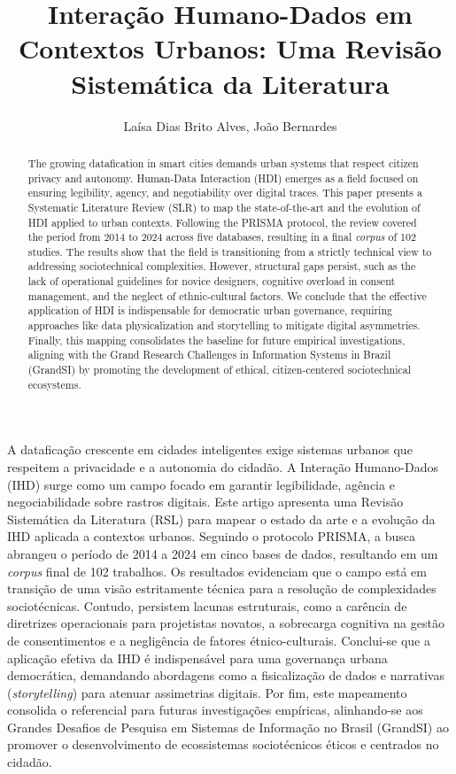 \documentclass[12pt]{article}
\title{Interação Humano-Dados em Contextos Urbanos: Uma Revisão Sistemática da Literatura}
\author{Laísa Dias Brito Alves\inst{1}, João Bernardes\inst{2} }
\begin{document}
 

\maketitle

\begin{abstract}
The growing datafication in smart cities demands urban systems that respect citizen privacy and autonomy. Human-Data Interaction (HDI) emerges as a field focused on ensuring legibility, agency, and negotiability over digital traces. This paper presents a Systematic Literature Review (SLR) to map the state-of-the-art and the evolution of HDI applied to urban contexts. Following the PRISMA protocol, the review covered the period from 2014 to 2024 across five databases, resulting in a final \textit{corpus} of 102 studies. The results show that the field is transitioning from a strictly technical view to addressing sociotechnical complexities. However, structural gaps persist, such as the lack of operational guidelines for novice designers, cognitive overload in consent management, and the neglect of ethnic-cultural factors. We conclude that the effective application of HDI is indispensable for democratic urban governance, requiring approaches like data physicalization and storytelling to mitigate digital asymmetries. Finally, this mapping consolidates the baseline for future empirical investigations, aligning with the Grand Research Challenges in Information Systems in Brazil (GrandSI) by promoting the development of ethical, citizen-centered sociotechnical ecosystems.
\end{abstract}
     
\begin{resumo}
A dataficação crescente em cidades inteligentes exige sistemas urbanos que respeitem a privacidade e a autonomia do cidadão. A Interação Humano-Dados (IHD) surge como um campo focado em garantir legibilidade, agência e negociabilidade sobre rastros digitais. Este artigo apresenta uma Revisão Sistemática da Literatura (RSL) para mapear o estado da arte e a evolução da IHD aplicada a contextos urbanos. Seguindo o protocolo PRISMA, a busca abrangeu o período de 2014 a 2024 em cinco bases de dados, resultando em um \textit{corpus} final de 102 trabalhos. Os resultados evidenciam que o campo está em transição de uma visão estritamente técnica para a resolução de complexidades sociotécnicas. Contudo, persistem lacunas estruturais, como a carência de diretrizes operacionais para projetistas novatos, a sobrecarga cognitiva na gestão de consentimentos e a negligência de fatores étnico-culturais. Conclui-se que a aplicação efetiva da IHD é indispensável para uma governança urbana democrática, demandando abordagens como a fisicalização de dados e narrativas (\textit{storytelling}) para atenuar assimetrias digitais. Por fim, este mapeamento consolida o referencial para futuras investigações empíricas, alinhando-se aos Grandes Desafios de Pesquisa em Sistemas de Informação no Brasil (GrandSI) ao promover o desenvolvimento de ecossistemas sociotécnicos éticos e centrados no cidadão.
\end{resumo}
\end{document}
